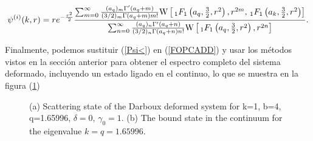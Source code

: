 \begin{equation}
\psi^{(i)}(k,r)=re^{-\frac{r^{2}}{2}}\frac{\sum_{m=0}^{\infty}\frac{(a_q)_{m}\Gamma'(a_{q}+m)}{(3/2)_{m}\Gamma(a_{q}+m)m!}{\rm W}\left[\, _1F_1\left(a_{q},\frac{3}{2},r^{2}\right),r^{2m},\, _1F_1\left(a_k,\frac{3}{2},r^{2}\right)\right]}{\sum_{n=0}^{\infty}\frac{(a_q)_{n}\Gamma'(a_{q}+n)}{(3/2)_{n}\Gamma(a_{q}+n)n!}{\rm W}\left[\, _1F_1\left(a_{q},\frac{3}{2},r^{2}\right),r^{2n}\right]}\label{Psi<}.
\end{equation}

Finalmente, podemos sustituir (\ref{Psi<}) en (\ref{FOPCADD}) y usar los métodos vistos en la sección anterior para obtener el espectro completo del sistema deformado, incluyendo un estado ligado en el continuo, lo que se muestra en la figura (\ref{DTHO})

\begin{figure}
	\centering
	\hfill%
	\caption{\label{DTHO} (a) Scattering state of the Darboux deformed system for k=1, b=4, q=1.65996, $\delta=0$, $\gamma_0=1$. (b) The bound state in the continuum for the eigenvalue $k=q=1.65996$.}
\end{figure} 

